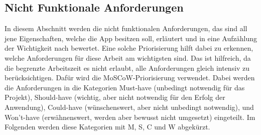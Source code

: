 \subsection{Nicht Funktionale Anforderungen}\label{subsection:anforderung:nichtFunktionaleAnforderungen}
In diesem Abschnitt werden die nicht funktionalen Anforderungen, das sind all jene Eigenschaften, welche die App besitzen soll, erläutert und in eine Aufzählung der Wichtigkeit nach bewertet.\newline%
Eine solche Priorisierung hilft dabei zu erkennen, welche Anforderungen für diese Arbeit am wichtigsten sind. Das ist hilfreich, da die begrenzte Arbeitszeit es nicht erlaubt, alle Anforderungen gleich intensiv zu berücksichtigen.\newline%
Dafür wird die MoSCoW-Priorisierung verwendet. Dabei werden die Anforderungen in die Kategorien \glqq Must-have\grqq{} (unbedingt notwendig für das Projekt), \glqq Should-have\grqq{} (wichtig, aber nicht notwendig für den Erfolg der Anwendung), \glqq Could-have\grqq{} (wünschenswert, aber nicht unbedingt notwendig), und \glqq Won't-have\grqq{} (erwähnenswert, werden aber bewusst nicht umgesetzt) eingeteilt. Im Folgenden werden diese Kategorien mit M, S, C und W abgekürzt.%
%
